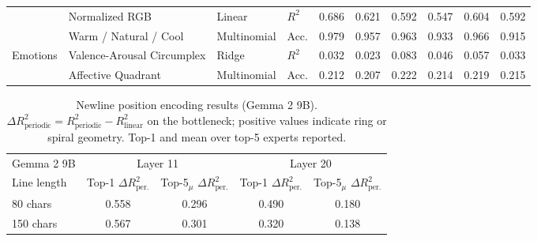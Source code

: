 \begin{table}[htbp]
{\begin{tabular}{ll ll rr rr rr}
 & Normalized RGB & Linear & $R^2$ & 0.686 & 0.621 & 0.592 & 0.547 & 0.604 & 0.592 \\
 & Warm / Natural / Cool & Multinomial & Acc. & 0.979 & 0.957 & 0.963 & 0.933 & 0.966 & 0.915 \\
\midrule
\multirow{2}{*}{Emotions} & Valence-Arousal Circumplex & Ridge & $R^2$ & 0.032 & 0.023 & 0.083 & 0.046 & 0.057 & 0.033 \\
 & Affective Quadrant & Multinomial & Acc. & 0.212 & 0.207 & 0.222 & 0.214 & 0.219 & 0.215 \\
\bottomrule
\end{tabular}
}%
\end{table}

\begin{table}[htbp]
\centering
\small
\caption{Newline position encoding results (Gemma 2 9B). $\Delta R^2_{\text{periodic}} = R^2_{\text{periodic}} - R^2_{\text{linear}}$ on the bottleneck; positive values indicate ring or spiral geometry. Top-1 and mean over top-5 experts reported.}
\label{tab:newline}
\begin{tabular}{l cc cc}
\toprule
\multicolumn{1}{l}{Gemma 2 9B} & \multicolumn{2}{c}{Layer 11} & \multicolumn{2}{c}{Layer 20} \\
\cmidrule(lr){2-3} \cmidrule(lr){4-5}
Line length & Top-1 $\Delta R^2_{\text{per.}}$ & Top-5$_{\mu}$ $\Delta R^2_{\text{per.}}$ & Top-1 $\Delta R^2_{\text{per.}}$ & Top-5$_{\mu}$ $\Delta R^2_{\text{per.}}$ \\
\midrule
80 chars & 0.558 & 0.296 & 0.490 & 0.180 \\
150 chars & 0.567 & 0.301 & 0.320 & 0.138 \\
\bottomrule
\end{tabular}
\end{table}
